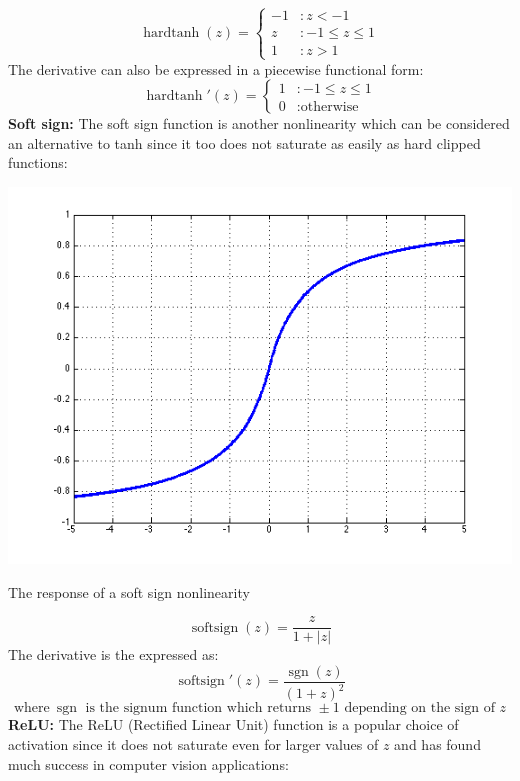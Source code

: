 \documentclass{tufte-handout}
\begin{document}
\begin{displaymath}
    \operatorname{hardtanh}(z) = \left\{
     \begin{array}{cl}
       -1 & : z < -1\\
       z & : -1 \leq z \leq 1\\
       1 & : z > 1
     \end{array}
   \right.
\end{displaymath} 
The derivative can also be expressed in a piecewise functional form:
\begin{displaymath}
    \operatorname{hardtanh}'(z) = \left\{
     \begin{array}{cl}
       1 & : -1 \leq z \leq 1\\
       0 & : \text{otherwise}
     \end{array}
   \right.
\end{displaymath} 
\textbf{Soft sign:}
The soft sign function is another nonlinearity which can be considered an alternative to tanh since it too does not saturate as easily as hard clipped functions:
\begin{marginfigure}%
  \includegraphics[width=\linewidth]{graph_softsign}
  \caption{The response of a soft sign nonlinearity}
  \label{fig:graph_softsign}
\end{marginfigure}
$$\operatorname{softsign}(z) = \frac{z}{1 + |z|}$$
The derivative is the expressed as:
$$\operatorname{softsign}'(z) = \frac{\operatorname{sgn}(z)}{(1 + z)^2}$$
$$\text{where}~\operatorname{sgn} \text{ is the signum function which returns }\pm1\text{ depending on the sign of }z$$
$$ $$
\textbf{ReLU:} The ReLU (Rectified Linear Unit) function is a popular choice of activation since it does not saturate even for larger values of $z$ and has found much success in computer vision applications:
\end{document}
